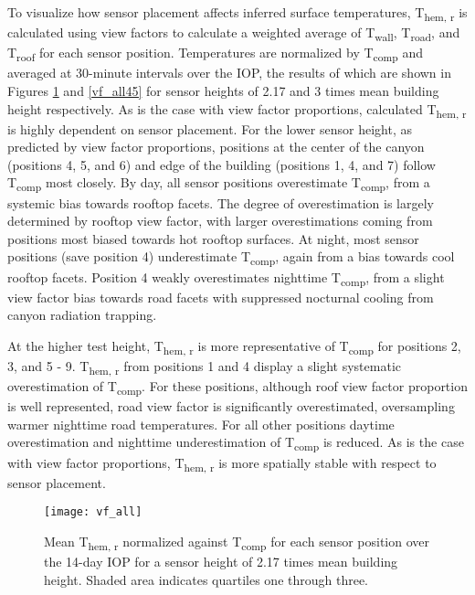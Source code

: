 To visualize how sensor placement affects inferred surface temperatures, T\textsubscript{hem, r} is calculated using view factors to calculate a weighted average of T\textsubscript{wall}, T\textsubscript{road}, and T\textsubscript{roof} for each sensor position. Temperatures are normalized by T\textsubscript{comp} and averaged at 30-minute intervals over the IOP, the results of which are shown in Figures \ref{vf_all} and \ref{vf_all45} for sensor heights of 2.17 and 3 times mean building height respectively. As is the case with view factor proportions, calculated T\textsubscript{hem, r} is highly dependent on sensor placement. For the lower sensor height, as predicted by view factor proportions, positions at the center of the canyon (positions 4, 5, and 6) and edge of the building (positions 1, 4, and 7) follow T\textsubscript{comp} most closely. By day, all sensor positions overestimate T\textsubscript{comp}, from a systemic bias towards rooftop facets. The degree of overestimation is largely determined by rooftop view factor, with larger overestimations coming from positions most biased towards hot rooftop surfaces. At night, most sensor positions (save position 4) underestimate T\textsubscript{comp}, again from a bias towards cool rooftop facets. Position 4 weakly overestimates nighttime T\textsubscript{comp}, from a slight view factor bias towards road facets with suppressed nocturnal cooling from canyon radiation trapping. 

At the higher test height, T\textsubscript{hem, r} is more representative of T\textsubscript{comp} for positions 2, 3, and 5 - 9. T\textsubscript{hem, r} from positions 1 and 4 display a slight systematic overestimation of T\textsubscript{comp}. For these positions, although roof view factor proportion is well represented, road view factor is significantly overestimated, oversampling warmer nighttime road temperatures. For all other positions daytime overestimation and nighttime underestimation of T\textsubscript{comp} is reduced. As is the case with view factor proportions, T\textsubscript{hem, r} is more spatially stable with respect to sensor placement.
 
   \begin{figure}[H]
 	\centering
 	\texttt{[image: vf\_all]}
 	\caption{Mean T\textsubscript{hem, r} normalized against T\textsubscript{comp} for each sensor position over the 14-day IOP for a sensor height of 2.17 times mean building height. Shaded area indicates quartiles one through three.}
 	\label{vf_all}
 \end{figure}


